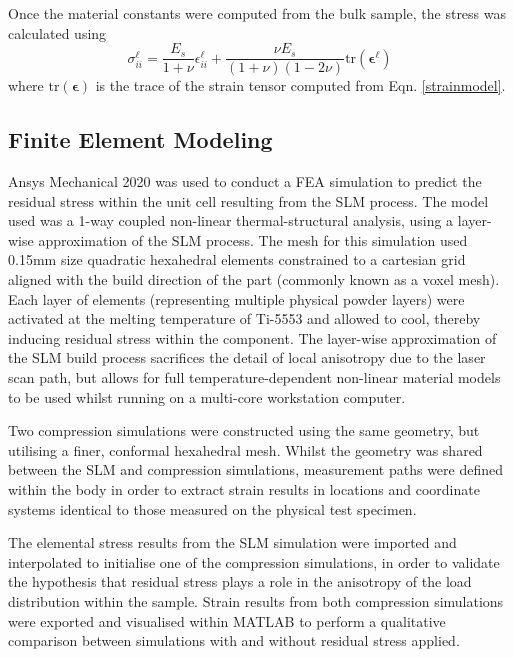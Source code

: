 Once the material constants were computed from the bulk sample, the stress was calculated using
\begin{equation}
	\sigma_{ii}^\ell = \frac{E_s}{1+\nu}\epsilon_{ii}^\ell + \frac{\nu E_s}{(1+\nu)(1-2\nu)}\text{tr}\left(\mathbf{\epsilon^\ell}\right)
	\label{sigma}
\end{equation}
where $\text{tr}\left(\mathbf{\epsilon}\right)$ is the trace of the strain tensor computed from Eqn. \ref{strainmodel}. 

\subsection{Finite Element Modeling}
Ansys Mechanical 2020 was used to conduct a FEA simulation to predict the residual stress within the unit cell resulting from the SLM process. The model used was a 1-way coupled non-linear thermal-structural analysis, using a layer-wise approximation of the SLM process. The mesh for this simulation used 0.15mm size quadratic hexahedral elements constrained to a cartesian grid aligned with the build direction of the part (commonly known as a voxel mesh). Each layer of elements (representing multiple physical powder layers) were activated at the melting temperature of Ti-5553 and allowed to cool, thereby inducing residual stress within the component. The layer-wise approximation of the SLM build process sacrifices the detail of local anisotropy due to the laser scan path, but allows for full temperature-dependent non-linear material models to be used whilst running on a multi-core workstation computer.

Two compression simulations were constructed using the same geometry, but utilising a finer, conformal hexahedral mesh. Whilst the geometry was shared between the SLM and compression simulations, measurement paths were defined within the body in order to extract strain results in locations and coordinate systems identical to those measured on the physical test specimen.

The elemental stress results from the SLM simulation were imported and interpolated to initialise one of the compression simulations, in order to validate the hypothesis that residual stress plays a role in the anisotropy of the load distribution within the sample. Strain results from both compression simulations were exported and visualised within MATLAB to perform a qualitative comparison between simulations with and without residual stress applied.


